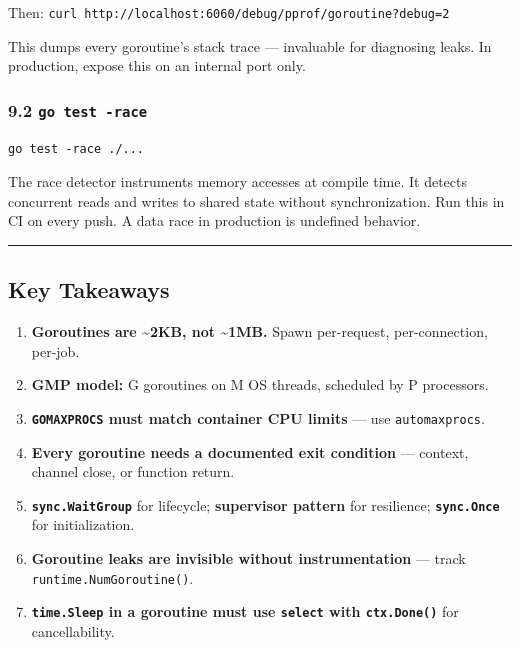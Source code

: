 \documentclass[11pt,a4paper,oneside]{book}
\providecommand{\tightlist}{\setlength{\itemsep}{0pt}\setlength{\parskip}{0pt}}
\begin{document}
Then: \texttt{curl\ http://localhost:6060/debug/pprof/goroutine?debug=2}

This dumps every goroutine's stack trace --- invaluable for diagnosing
leaks. In production, expose this on an internal port only.

\subsubsection{\texorpdfstring{9.2
\texttt{go\ test\ -race}}{9.2 go test -race}}

\begin{verbatim}
go test -race ./...
\end{verbatim}

The race detector instruments memory accesses at compile time. It
detects concurrent reads and writes to shared state without
synchronization. Run this in CI on every push. A data race in production
is undefined behavior.

\begin{center}\rule{0.5\linewidth}{0.5pt}\end{center}

\subsection{Key Takeaways}

\begin{enumerate}
\def\labelenumi{\arabic{enumi}.}
\tightlist
\item
  \textbf{Goroutines are \textasciitilde2KB, not \textasciitilde1MB.}
  Spawn per-request, per-connection, per-job.
\item
  \textbf{GMP model:} G goroutines on M OS threads, scheduled by P
  processors.
\item
  \textbf{\texttt{GOMAXPROCS} must match container CPU limits} --- use
  \texttt{automaxprocs}.
\item
  \textbf{Every goroutine needs a documented exit condition} ---
  context, channel close, or function return.
\item
  \textbf{\texttt{sync.WaitGroup}} for lifecycle; \textbf{supervisor
  pattern} for resilience; \textbf{\texttt{sync.Once}} for
  initialization.
\item
  \textbf{Goroutine leaks are invisible without instrumentation} ---
  track \texttt{runtime.NumGoroutine()}.
\item
  \textbf{\texttt{time.Sleep} in a goroutine must use \texttt{select}
  with \texttt{ctx.Done()}} for cancellability.
\end{enumerate}
\end{document}
